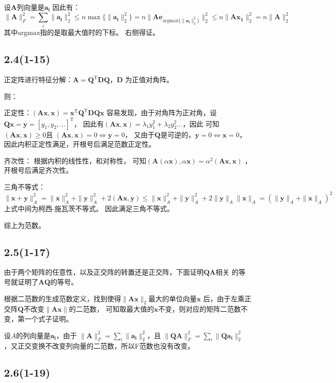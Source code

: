 \documentclass[UTF8,zihao=5]{ctexart}
\newcommand{\bm}[1]{{\mathbf{#1}}}
\newcommand{\trans}[0]{^\mathrm{T}}
\begin{document}
设$\bm{A}$列向量是$\bm{a_i}$
因此有：
$$
\|\bm{A}\|_F^2=\sum_i{\|\bm{a_i}\|_2^2}
\leq n \max{\{\|\bm{a_i}\|_2^2\}}
=n\|\bm{A}\bm{e}_{\mathrm{argmax}\{\|\bm{a_i}\|_2^2\}}\|_2^2
\leq n\|\bm{A}\bm{x_1}\|_2^2
=n\|\bm{A}\|_2^2
$$
其中$\mathrm{argmax}$指的是取最大值时的下标。
右侧得证。

\subsection*{2.4(1-15)}

正定阵进行特征分解：$\bm{A}=\bm{Q}\trans\bm{DQ}$，$\bm{D}$
为正值对角阵。

则：

正定性：$(\bm{Ax},\bm{x})=\bm{x}\trans\bm{Q}\trans\bm{DQx}$
容易发现，由于对角阵为正对角，设$\bm{Qx}=\bm{y}=[y_1,y_2,...]\trans$，
因此有$(\bm{Ax},\bm{x})=\lambda_1y_1^2+\lambda_2y_2^2...$，因此
可知$(\bm{Ax},\bm{x})\geq 0 $且
$(\bm{Ax},\bm{x})=0 \Leftrightarrow \bm{y}=0 $，
又由于$\bm{Q}$是可逆的，$\bm{y}=0\Leftrightarrow\bm{x}=0$，
因此内积正定性满足，开根号后满足范数正定性。


齐次性：
根据内积的线性性，和对称性，
可知$(\bm{A}(\alpha \bm{x}),\alpha\bm{x})=\alpha^2(\bm{Ax},\bm{x})$
，开根号后满足齐次性。

三角不等式：
$$
\|\bm{x+y}\|^2_A=\|\bm{x}\|^2_A+\|\bm{y}\|^2_A+2(\bm{Ax},\bm{y})
\leq\|\bm{x}\|^2_A+\|\bm{y}\|^2_A+2\|\bm{y}\|_A\|\bm{x}\|_A
=(\|\bm{y}\|_A+\|\bm{x}\|_A)^2
$$
上式中间为柯西-施瓦茨不等式。
因此满足三角不等式。

综上为范数。

\subsection*{2.5(1-17)}

由于两个矩阵的任意性，以及正交阵的转置还是正交阵，下面证明$\bm{QA}$相关
的等号就证明了$\bm{AQ}$的等号。

根据二范数的生成范数定义，找到使得$\|\bm{Ax}\|_2$最大的单位向量$\bm{x}$
后，由于左乘正交阵$\bm{Q}$不改变$\|\bm{Ax}\|$的二范数，
可知取最大值的$\bm{x}$不变，则对应的矩阵二范数不变，第一个式子证明。

设$A$的列向量是$\bm{a_i}$，由于
$\|\bm{A}\|_F^2=\sum_i\|\bm{a_i}\|_2^2$，且
$\|\bm{QA}\|_F^2=\sum_i\|\bm{Qa_i}\|_2^2$
，又正交变换不改变列向量的二范数，所以F范数也没有改变。

\subsection*{2.6(1-19)}
\end{document}
